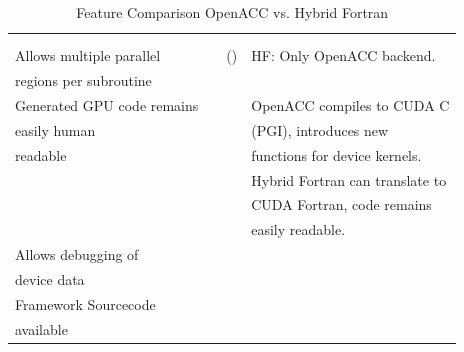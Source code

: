 \begin{table}[htpb]
\begin{tabular}{l|c|c|l}
		& & & \\
		& & & \\
		\hline
		Allows multiple parallel & \checkmark & (\checkmark) & HF: Only OpenACC backend. \\
		regions per subroutine & & & \\
		\hline
		Generated GPU code remains & & \checkmark & OpenACC compiles to CUDA C \\
		easily human & & & (PGI), introduces new \\
		readable & & & functions for device kernels. \\
		& & & Hybrid Fortran can translate to \\
		& & & CUDA Fortran, code remains \\
		& & & easily readable.\\
		\hline
		Allows debugging of & \checkmark & \checkmark & \\
		device data & & & \\
		\hline
		Framework Sourcecode & & \checkmark & \\
		available & & & \\
		\hline
	\end{tabular}
	\caption{Feature Comparison OpenACC vs. Hybrid Fortran}
	\label{table:featureComparisonFrameworks}
\end{table}


